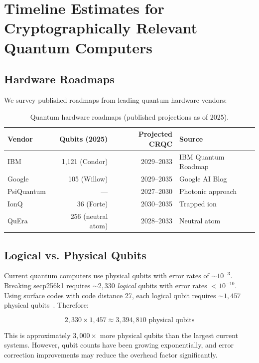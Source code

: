 \section{Timeline Estimates for Cryptographically Relevant Quantum Computers}

\label{sec:timeline}

\subsection{Hardware Roadmaps}

We survey published roadmaps from leading quantum hardware vendors:

\begin{table}[ht]
\centering
\caption{Quantum hardware roadmaps (published projections as of 2025).}
\label{tab:roadmaps}
\begin{tabular}{lrrl}
\toprule
\textbf{Vendor} & \textbf{Qubits (2025)} & \textbf{Projected CRQC} & \textbf{Source} \\
\midrule
IBM & 1{,}121 (Condor) & 2029--2033 & IBM Quantum Roadmap \\
Google & 105 (Willow) & 2029--2035 & Google AI Blog \\
PsiQuantum & --- & 2027--2030 & Photonic approach \\
IonQ & 36 (Forte) & 2030--2035 & Trapped ion \\
QuEra & 256 (neutral atom) & 2028--2033 & Neutral atom \\
\bottomrule
\end{tabular}
\end{table}

\subsection{Logical vs. Physical Qubits}

Current quantum computers use physical qubits with error rates of $\sim$$10^{-3}$.
Breaking secp256k1 requires $\sim$$2{,}330$ \emph{logical} qubits with error rates
$< 10^{-10}$. Using surface codes with code distance 27, each logical qubit requires
$\sim$$1{,}457$ physical qubits~\cite{gidney2021factor}. Therefore:

\[
  2{,}330 \times 1{,}457 \approx 3{,}394{,}810 \text{ physical qubits}
\]

This is approximately $3{,}000\times$ more physical qubits than the largest current
systems. However, qubit counts have been growing exponentially, and error correction
improvements may reduce the overhead factor significantly.

